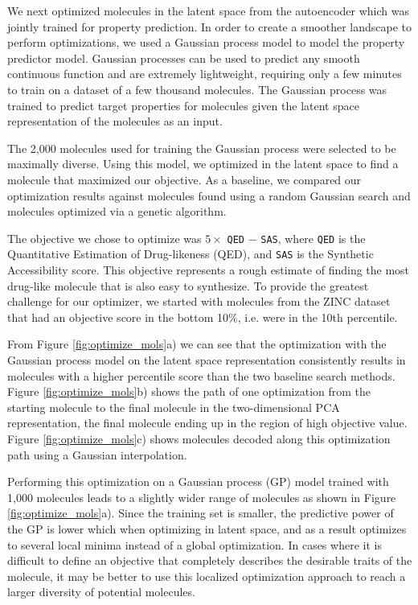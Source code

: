 We next optimized molecules in the latent space from the autoencoder which was jointly trained for property prediction. In order to create a smoother landscape to perform optimizations, we used a Gaussian process model to model the property predictor model. Gaussian processes can be used to predict any smooth continuous function\cite{rasmussen2006gaussian} and are extremely lightweight, requiring only a few minutes to train on a dataset of a few thousand molecules. The Gaussian process was trained to predict target properties for molecules given the latent space representation of the molecules as an input.

The 2,000 molecules used for training the Gaussian process were selected to be maximally diverse. Using this model, we optimized in the latent space to find a molecule that maximized our objective. As a baseline, we compared our optimization results against molecules found using a random Gaussian search and molecules optimized via a genetic algorithm.

The objective we chose to optimize was $5 \times$ \texttt{QED} $-$ \texttt{SAS}, where \texttt{QED} is the Quantitative Estimation of Drug-likeness (QED)\cite{bickerton2012quantifying}, and \texttt{SAS} is the Synthetic Accessibility score\cite{Ertl2009estimation}. This objective represents a rough estimate of finding the most drug-like molecule that is also easy to synthesize. To provide the greatest challenge for our optimizer, we started with molecules from the ZINC dataset that had an objective score in the bottom 10\%, i.e. were in the 10th percentile.

From Figure \ref{fig:optimize_mols}a) we can see that the optimization with the Gaussian process model on the latent space representation consistently results in molecules with a higher percentile score than the two baseline search methods. Figure \ref{fig:optimize_mols}b) shows the path of one optimization from the starting molecule to the final molecule in the two-dimensional PCA representation, the final molecule ending up in the region of high objective value. Figure \ref{fig:optimize_mols}c)  shows molecules decoded along this optimization path using a Gaussian interpolation.

Performing this optimization on a Gaussian process (GP) model trained with 1,000 molecules leads to a slightly wider range of molecules as shown in Figure \ref{fig:optimize_mols}a).
  Since the training set is smaller, the predictive power of the GP is lower which when optimizing in latent space, and as a result optimizes to several local minima instead of a global optimization.  In cases where it is difficult to define an objective that completely describes the desirable traits of the molecule, it may be better to use this localized optimization approach to reach a larger diversity of potential molecules.

